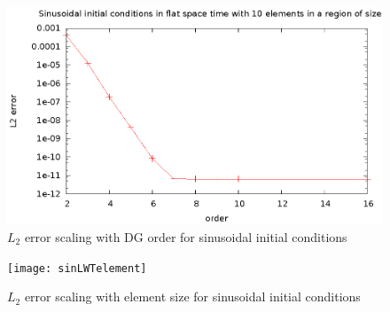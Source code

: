 \begin{figure}
  \includegraphics{sinL2WTorder}
  \caption{$L_2$ error scaling with DG order for sinusoidal initial conditions}
\end{figure}

\begin{figure}
  \texttt{[image: sinLWTelement]}
  \caption{$L_2$ error scaling with element size for sinusoidal initial conditions}
\end{figure}



